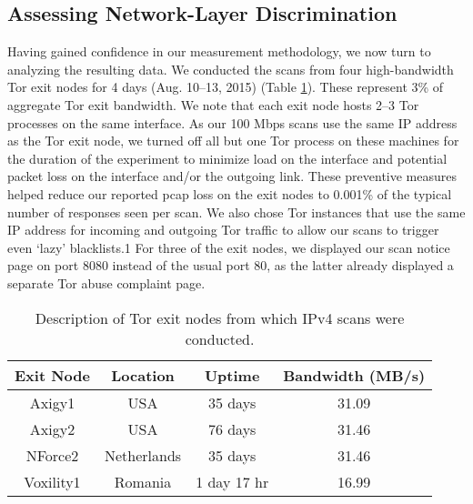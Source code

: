 \documentclass[12pt]{spieman}
\begin{document}
\begin{spacing}{2}
\subsection{Assessing Network-Layer Discrimination }
Having gained confidence in our measurement methodology, we now turn to analyzing the resulting data. We conducted the scans from four high-bandwidth Tor exit nodes for 4 days (Aug. 10–13, 2015) (Table \ref{tab:2}). These represent 3\% of aggregate Tor exit bandwidth. We note that each exit node hosts 2–3 Tor processes on the same interface. As our 100 Mbps scans use the same IP address as the Tor exit node, we turned off all but one Tor process on these machines for the duration of the experiment to minimize load on the interface and potential packet loss on the interface and/or the outgoing link. These preventive measures helped reduce our reported pcap loss on the exit nodes to 0.001\% of the typical number of responses seen per scan. We also chose Tor instances that use the same IP address for incoming and outgoing Tor traffic to allow our scans to trigger even ‘lazy’ blacklists.1 For three of the exit nodes, we displayed our scan notice page on port 8080 instead of the usual port 80, as the latter already displayed a separate Tor abuse complaint page.

\begin{table}[ht]
\caption{Description of Tor exit nodes from which IPv4 scans were conducted.} 
\label{tab:2}
\begin{center}      
\begin{tabular}{|c|c|c|c|}
\hline
\rule[-1ex]{0pt}{3.5ex}  Exit Node & Location & Uptime & Bandwidth (MB/s)  \\
\hline
\rule[-1ex]{0pt}{3.5ex}  Axigy1 & USA & 35 days & 31.09   \\
\hline
\rule[-1ex]{0pt}{3.5ex}  Axigy2 & USA & 76 days & 31.46  \\
\hline
\rule[-1ex]{0pt}{3.5ex}  NForce2 & Netherlands & 35 days & 31.46  \\
\hline
\rule[-1ex]{0pt}{3.5ex}  Voxility1 & Romania & 1 day 17 hr & 16.99  \\
\hline 
\end{tabular}
\end{center}
\end{table} 


\end{spacing}
\end{document}
